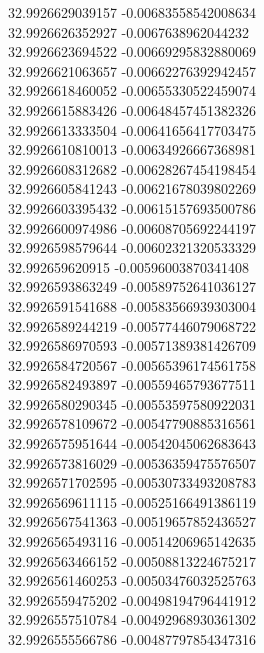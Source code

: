 {32.9926629039157	-0.00683558542008634\\
32.9926626352927	-0.0067638962044232\\
32.9926623694522	-0.00669295832880069\\
32.9926621063657	-0.00662276392942457\\
32.9926618460052	-0.00655330522459074\\
32.9926615883426	-0.00648457451382326\\
32.9926613333504	-0.00641656417703475\\
32.9926610810013	-0.00634926667368981\\
32.9926608312682	-0.00628267454198454\\
32.9926605841243	-0.00621678039802269\\
32.9926603395432	-0.00615157693500786\\
32.9926600974986	-0.00608705692244197\\
32.9926598579644	-0.00602321320533329\\
32.992659620915	-0.00596003870341408\\
32.9926593863249	-0.00589752641036127\\
32.9926591541688	-0.00583566939303004\\
32.9926589244219	-0.00577446079068722\\
32.9926586970593	-0.00571389381426709\\
32.9926584720567	-0.00565396174561758\\
32.9926582493897	-0.00559465793677511\\
32.9926580290345	-0.00553597580922031\\
32.9926578109672	-0.00547790885316561\\
32.9926575951644	-0.00542045062683643\\
32.9926573816029	-0.00536359475576507\\
32.9926571702595	-0.00530733493208783\\
32.9926569611115	-0.00525166491386119\\
32.9926567541363	-0.00519657852436527\\
32.9926565493116	-0.00514206965142635\\
32.9926563466152	-0.00508813224675217\\
32.9926561460253	-0.00503476032525763\\
32.9926559475202	-0.00498194796441912\\
32.9926557510784	-0.00492968930361302\\
32.9926555566786	-0.00487797854347316\\
}
